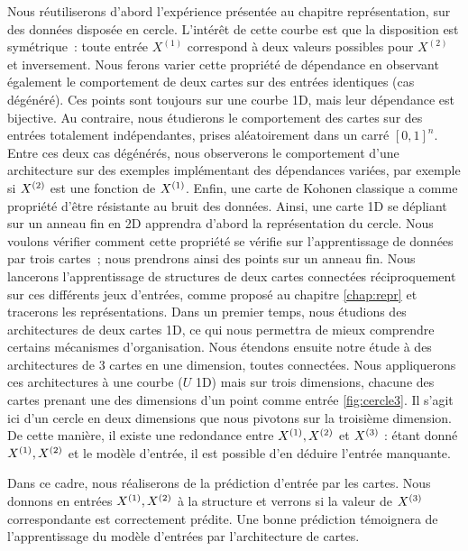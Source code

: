 \documentclass[../main]{subfiles}
\begin{document}
Nous réutiliserons d'abord l'expérience présentée au chapitre représentation, sur des données disposée en cercle. L'intérêt de cette courbe est que la disposition est symétrique~: toute entrée $X^{(1)}$ correspond à deux valeurs possibles pour $X^{(2)}$ et inversement.
Nous ferons varier cette propriété de dépendance en observant également le comportement de deux cartes sur des entrées identiques (cas dégénéré). Ces points sont toujours sur une courbe 1D, mais leur dépendance est bijective.
Au contraire, nous étudierons le comportement des cartes sur des entrées totalement indépendantes, prises aléatoirement dans un carré $[0,1]^n$.
Entre ces deux cas dégénérés, nous observerons le comportement d'une architecture sur des exemples implémentant des dépendances variées, par exemple si $X^{({2})}$ est une fonction de $X^{({1})}$.
Enfin, une carte de Kohonen classique a comme propriété d'être résistante au bruit des données. Ainsi, une carte 1D se dépliant sur un anneau fin en 2D apprendra d'abord la représentation du cercle. Nous voulons vérifier comment cette propriété se vérifie sur l'apprentissage de données par trois cartes~; nous prendrons ainsi des points sur un anneau fin.
Nous lancerons l'apprentissage de structures de deux cartes connectées réciproquement sur ces différents jeux d'entrées, comme proposé au chapitre \ref{chap:repr} et tracerons les représentations. 
Dans un premier temps, nous étudions des architectures de deux cartes 1D, ce qui nous permettra de mieux comprendre certains mécanismes d'organisation.
Nous étendons ensuite notre étude à des architectures de 3 cartes en une dimension, toutes connectées. Nous appliquerons ces architectures à une courbe ($U$ 1D) mais sur trois dimensions, chacune des cartes prenant une des dimensions d'un point comme entrée \ref{fig:cercle3}. Il s'agit ici d'un cercle en deux dimensions que nous pivotons sur la troisième dimension. De cette manière, il existe une redondance entre $X^{({1})}, X^{({2})}$ et $X^{({3})}$ : étant donné $X^{({1})}, X^{({2})}$ et le modèle d'entrée, il est possible d'en déduire l'entrée manquante.

Dans ce cadre, nous réaliserons de la prédiction d'entrée par les cartes. Nous donnons en entrées $X^{({1})}, X^{({2})}$ à la structure et verrons si la valeur de $X^{({3})}$ correspondante est correctement prédite. Une bonne prédiction témoignera de l'apprentissage du modèle d'entrées par l'architecture de cartes.
\end{document}
